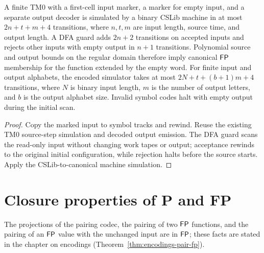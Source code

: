 \begin{theorem}
  \label{thm:marked-tape-fp}
  \leanok
  A finite TM0 with a first-cell input marker, a marker for empty input, and
  a separate output decoder is simulated by a binary CSLib machine in at most
  $2n+t+m+4$ transitions, where $n,t,m$ are input length, source time, and output
  length. A DFA guard adds $2n+2$ transitions on accepted inputs and rejects
  other inputs with empty output in $n+1$ transitions. Polynomial source and
  output bounds on the regular domain therefore imply canonical $\mathsf{FP}$
  membership for the function extended by the empty word.
  For finite input and output alphabets, the encoded simulator takes at most
  $2N+t+(b+1)m+4$ transitions, where $N$ is binary input length, $m$ is the
  number of output letters, and $b$ is the output alphabet size. Invalid symbol
  codes halt with empty output during the initial scan.
\end{theorem}
\begin{proof}
  \leanok
  Copy the marked input to symbol tracks and rewind. Reuse the existing TM0
  source-step simulation and decoded output emission. The DFA guard scans the
  read-only input without changing work tapes or output; acceptance rewinds to
  the original initial configuration, while rejection halts before the source
  starts. Apply the CSLib-to-canonical machine simulation.
\end{proof}

\section{Closure properties of P and FP}

The projections of the pairing codec, the pairing of two $\mathsf{FP}$ functions,
and the pairing of an $\mathsf{FP}$ value with the unchanged input are in $\mathsf{FP}$;
these facts are stated in the chapter on encodings
(Theorem~\ref{thm:encodings-pair-fp}).

